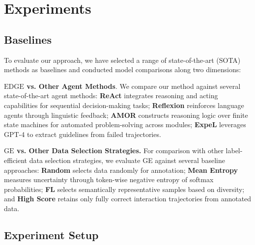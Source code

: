 



\section{Experiments}


\subsection{Baselines}
To evaluate our approach, we have selected a range of state-of-the-art (SOTA) methods as baselines and conducted model comparisons along two dimensions: 

\textbf{$\text{EDGE}$ vs. Other Agent Methods}. We compare our method against several state-of-the-art agent methods: \textbf{ReAct} \cite{Yao-Shunyu-ICLR-2023-ReAct} integrates reasoning and acting capabilities for sequential decision-making tasks; \textbf{Reflexion} \cite{Shinn-Noah-NeurIPS-2023-Reflexion} reinforces language agents through linguistic feedback; \textbf{AMOR} \cite{Guan-Jian-NeurIPS-2024-AMOR} constructs reasoning logic over finite state machines for automated problem-solving across modules; \textbf{ExpeL} \cite{Zhao-Andrew-AAAI-2024-ExpeL} leverages GPT-4 to extract guidelines from failed trajectories.

\textbf{$\text{GE}$ vs. Other Data Selection Strategies.} For comparison with other label-efficient data selection strategies, we evaluate GE against several baseline approaches: \textbf{Random} selects data randomly for annotation; \textbf{Mean Entropy} \cite{Settles-Burr-JMLR-2011-ActiveLearning,Kremer-Jan-WIREs-DMKD-2014-ActiveSVM} measures uncertainty through token-wise negative entropy of softmax probabilities; \textbf{FL} \cite{Bhatt-Gantavya-ACL-2024-ExperimentalDesign} selects semantically representative samples based on diversity; and \textbf{High Score} \cite{Chen-Baian-2023-FireAct,zeng-etal-2024-agenttuning} retains only fully correct interaction trajectories from annotated data.

\subsection{Experiment Setup}



